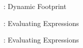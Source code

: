 
\begin{figure}
    
    \caption{\svl: Dynamic Footprint}
\end{figure}

\begin{figure}
    
    \caption{\svl: Evaluating Expressions}
\end{figure}

\begin{figure}
    \boxed{\evalphi \phi}
    
    \caption{\svl: Evaluating Expressions}
\end{figure}
